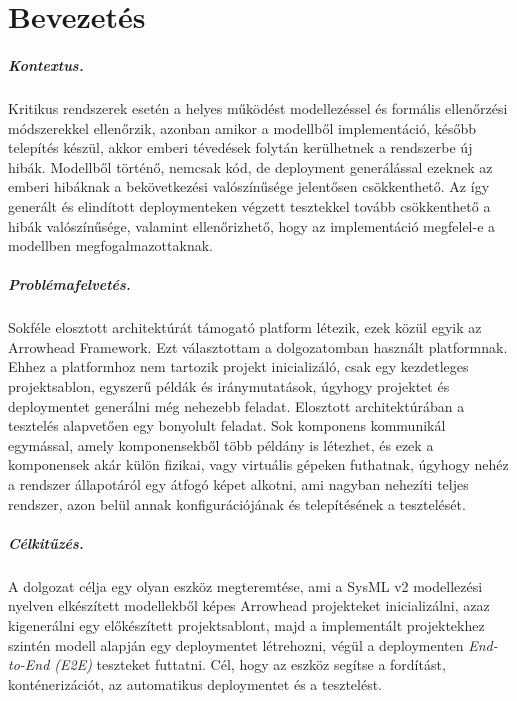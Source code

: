 \setlength{\parindent}{0pt}
\setlength{\parskip}{0.6em}

\chapter{Bevezetés}
\label{sec:intro}


\paragraph{Kontextus.} 

Kritikus rendszerek esetén a helyes működést modellezéssel és formális ellenőrzési módszerekkel ellenőrzik, azonban amikor a modellből implementáció, később telepítés készül, akkor emberi tévedések folytán kerülhetnek a rendszerbe új hibák. Modellből történő, nemcsak kód, de deployment generálással ezeknek az emberi hibáknak a bekövetkezési valószínűsége jelentősen csökkenthető. Az így generált és elindított deploymenteken végzett tesztekkel tovább csökkenthető a hibák valószínűsége, valamint ellenőrizhető, hogy az implementáció megfelel-e a modellben megfogalmazottaknak.

\paragraph{Problémafelvetés.}
Sokféle elosztott architektúrát támogató platform létezik, ezek közül egyik az Arrowhead Framework. Ezt választottam a dolgozatomban használt platformnak. Ehhez a platformhoz nem tartozik projekt inicializáló, csak egy kezdetleges projektsablon, egyszerű példák és iránymutatások, úgyhogy projektet és deploymentet generálni még nehezebb feladat. Elosztott architektúrában a tesztelés alapvetően egy bonyolult feladat. Sok komponens kommunikál egymással, amely komponensekből több példány is létezhet, és ezek a komponensek akár külön fizikai, vagy virtuális gépeken futhatnak, úgyhogy nehéz a rendszer állapotáról egy átfogó képet alkotni, ami nagyban nehezíti teljes rendszer, azon belül annak konfigurációjának és telepítésének a tesztelését.

\paragraph{Célkitűzés.}
A dolgozat célja egy olyan eszköz megteremtése, ami a SysML v2 modellezési nyelven elkészített modellekből képes Arrowhead projekteket inicializálni, azaz kigenerálni egy előkészített projektsablont, majd a implementált projektekhez szintén modell alapján egy deploymentet létrehozni, végül a deploymenten \emph{End-to-End (E2E)} teszteket futtatni. Cél, hogy az eszköz segítse a fordítást, konténerizációt, az automatikus deploymentet és a tesztelést.

